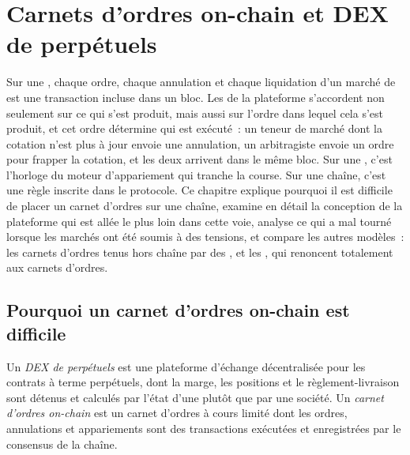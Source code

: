\chapter{Carnets d'ordres on-chain et DEX de perpétuels}\label{ch:m3:on-chain-order-books-and-perpetual-dexs}

Sur une , chaque ordre, chaque annulation et chaque liquidation d'un marché de 
est une transaction incluse dans un bloc. Les  de la plateforme s'accordent non seulement sur ce qui s'est
produit, mais aussi sur l'ordre dans lequel cela s'est produit, et cet ordre détermine qui est exécuté~: un teneur de marché
dont la cotation n'est plus à jour envoie une annulation, un arbitragiste envoie un ordre pour frapper la cotation, et les
deux arrivent dans le même bloc. Sur une , c'est l'horloge du moteur d'appariement qui tranche la
course. Sur une chaîne, c'est une règle inscrite dans le protocole. Ce chapitre explique pourquoi il est difficile de placer
un carnet d'ordres sur une chaîne, examine en détail la conception de la plateforme qui est allée le plus loin dans cette
voie, analyse ce qui a mal tourné lorsque les marchés ont été soumis à des tensions, et compare les autres modèles~: les
carnets d'ordres tenus hors chaîne par des , et les , qui renoncent totalement aux carnets d'ordres.

\section{Pourquoi un carnet d'ordres on-chain est difficile}

\begin{definition}\label{def:m3:on-chain-order-books-and-perpetual-dexs:perpdex}
Un \emph{DEX de perpétuels} est une plateforme d'échange décentralisée pour les contrats à terme
perpétuels, dont la marge, les positions et le règlement-livraison sont détenus et calculés par l'état d'une 
plutôt que par une société. Un \emph{carnet d'ordres on-chain} est un carnet d'ordres à
cours limité dont les ordres, annulations et appariements sont des transactions exécutées et enregistrées par le consensus de la chaîne.
\end{definition}

